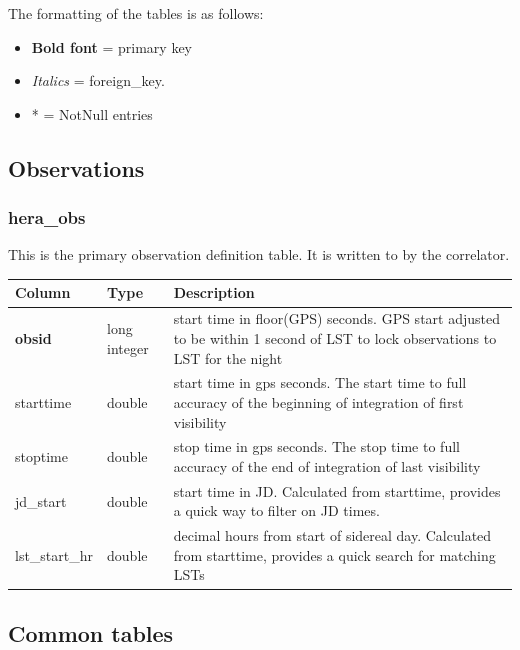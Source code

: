 \documentclass{article}
\begin{document}
{The formatting of the tables is as follows:
\begin{itemize}\setlength\itemsep{-.3em}
	\item {\bf Bold font} = primary key
	\item {\em Italics} = foreign\_key.
	\item * = NotNull entries
\end{itemize}


\subsection{Observations}
\subsubsection{hera\_obs}
This is the primary observation definition table. It is written to by the correlator.

\begin{center}
 \begin{tabular}{| p{4cm} | p{2cm} | p{10cm} |}
 \hline
 {\bf Column} & {\bf Type}  & {\bf Description} \\ [0.5ex]  \hline\hline
 \textbf{obsid} & long integer & start time in floor(GPS) seconds. GPS start adjusted to be within 1 second of LST to lock observations to LST for the night \\ \hline
 starttime & double & start time in gps seconds. The start time to full accuracy of the beginning of integration of first visibility \\\hline
 stoptime & double & stop time in gps seconds. The stop time to full accuracy of the end of integration of last visibility \\\hline
 jd\_start & double & start time in JD. Calculated from starttime, provides a quick way to filter on JD times. \\\hline
 lst\_start\_hr & double & decimal hours from start of sidereal day. Calculated from starttime, provides a quick search for matching LSTs \\\hline
 \end{tabular}
\end{center}

\subsection{Common tables}
}
\end{document}
